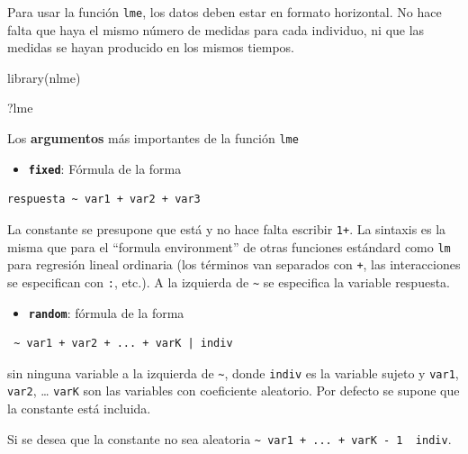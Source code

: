 \documentclass[
]{book}
\newenvironment{Shaded}{\begin{snugshade}}{\end{snugshade}}
\newcommand{\FunctionTok}[1]{\textcolor[rgb]{0.00,0.00,0.00}{#1}}
\newcommand{\NormalTok}[1]{#1}
\providecommand{\tightlist}{%
  \setlength{\itemsep}{0pt}\setlength{\parskip}{0pt}}
\begin{document}
Para usar la función \texttt{lme}, los datos deben estar en formato horizontal. No hace falta que haya el mismo número de medidas para cada individuo, ni que las medidas se hayan producido en los mismos tiempos.

\begin{Shaded}
\begin{Highlighting}[]
\FunctionTok{library}\NormalTok{(nlme)}
\end{Highlighting}
\end{Shaded}

\begin{Shaded}
\begin{Highlighting}[]
\NormalTok{?lme}
\end{Highlighting}
\end{Shaded}

Los \textbf{argumentos} más importantes de la función \texttt{lme}

\begin{itemize}
\tightlist
\item
  \textbf{\texttt{fixed}}: Fórmula de la forma
\end{itemize}

\begin{verbatim}
respuesta ~ var1 + var2 + var3
\end{verbatim}

La constante se presupone que está y no hace falta escribir \texttt{1+}.
La sintaxis es la misma que para el ``formula environment'' de otras funciones estándard como \texttt{lm} para regresión lineal ordinaria (los términos van separados con \texttt{+}, las interacciones se especifican con \texttt{:}, etc.).
A la izquierda de \texttt{\textasciitilde{}} se especifica la variable respuesta.

\begin{itemize}
\tightlist
\item
  \textbf{\texttt{random}}: fórmula de la forma
\end{itemize}

\begin{verbatim}
 ~ var1 + var2 + ... + varK | indiv
\end{verbatim}

sin ninguna variable a la izquierda de \texttt{\textasciitilde{}}, donde \texttt{indiv} es la variable sujeto y \texttt{var1}, \texttt{var2}, \ldots{} \texttt{varK} son las variables con coeficiente aleatorio.
Por defecto se supone que la constante está incluida.

Si se desea que la constante no sea aleatoria
\texttt{\textasciitilde{}\ var1\ +\ ...\ +\ varK\ -\ 1\ \textbar{}\ indiv}.
\end{document}
